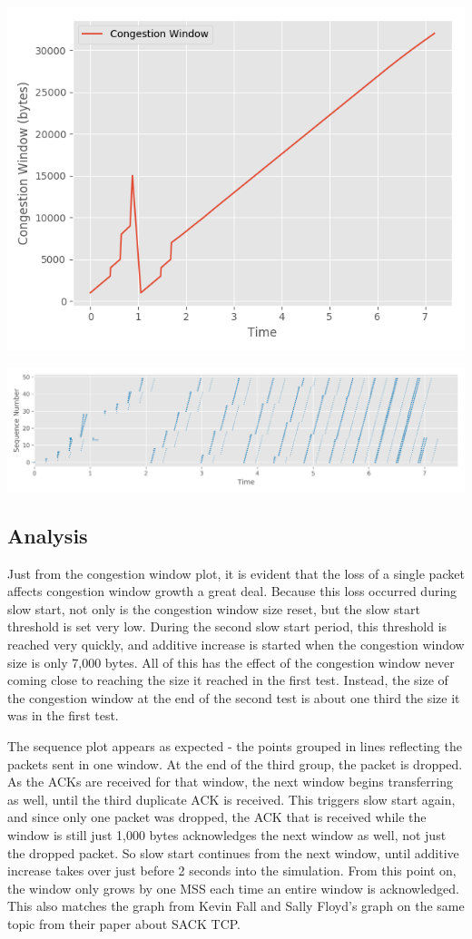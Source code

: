 \documentclass[fleqn,11pt]{article}
\begin{document}
	{
		\centering
		\includegraphics[]{cwnd2}
		
		\includegraphics[width=17cm]{sequence2}
		
	}

	\subsection{Analysis}
	
	Just from the congestion window plot, it is evident that the loss of a single packet affects
	congestion window growth a great deal. Because this loss occurred during slow start, not only is
	the congestion window size reset, but the slow start threshold is set very low. During the second
	slow start period, this threshold is reached very quickly, and additive increase is started when
	the congestion window size is only 7,000 bytes. All of this has the effect of the congestion
	window never coming close to reaching the size it reached in the first test. Instead, the size
	of the congestion window at the end of the second test is about one third the size it was in
	the first test.
	
	The sequence plot appears as expected - the points grouped in lines reflecting the packets sent in
	one window. At the end of the third group, the packet is dropped. As the ACKs are received for that window, the next window begins transferring as well, until the third duplicate ACK is received. This
	triggers slow start again, and since only one packet was dropped, the ACK that is received while
	the window is still just 1,000 bytes acknowledges the next window as well, not just the dropped
	packet. So slow start continues from the next window, until additive increase takes over just before
	2 seconds into the simulation. From this point on, the window only grows by one MSS each time
	an entire window is acknowledged. This also matches the graph from Kevin Fall and Sally Floyd's
	graph on the same topic from their paper about SACK TCP. 
	
\end{document}

